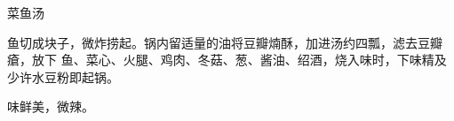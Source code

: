 \begin{recipe}{菜鱼汤}

\ingredients


\preparation

鱼切成块子，微炸捞起。锅内留适量的油将豆瓣煵酥，加进汤约四瓢，滤去豆瓣瘡，放下
鱼、菜心、火腿、鸡肉、冬菇、葱、酱油、绍酒，烧入味时，下味精及少许水豆粉即起锅。

\features

味鲜美，微辣。

\end{recipe}

